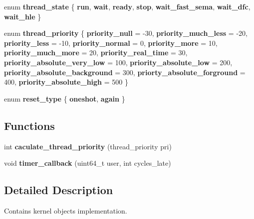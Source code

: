 \begin{DoxyCompactItemize}
enum {\bfseries thread\+\_\+state} \{ \newline
{\bfseries run}, 
{\bfseries wait}, 
{\bfseries ready}, 
{\bfseries stop}, 
\newline
{\bfseries wait\+\_\+fast\+\_\+sema}, 
{\bfseries wait\+\_\+dfc}, 
{\bfseries wait\+\_\+hle}
 \}
\item 
\mbox{\label{namespaceeka2l1_1_1kernel_a2eace89f7110e838a1260c2d9cb41ac4}} 
enum {\bfseries thread\+\_\+priority} \{ \newline
{\bfseries priority\+\_\+null} = -\/30, 
{\bfseries priority\+\_\+much\+\_\+less} = -\/20, 
{\bfseries priority\+\_\+less} = -\/10, 
{\bfseries priority\+\_\+normal} = 0, 
\newline
{\bfseries priority\+\_\+more} = 10, 
{\bfseries priority\+\_\+much\+\_\+more} = 20, 
{\bfseries priority\+\_\+real\+\_\+time} = 30, 
{\bfseries priority\+\_\+absolute\+\_\+very\+\_\+low} = 100, 
\newline
{\bfseries priority\+\_\+absolute\+\_\+low} = 200, 
{\bfseries priority\+\_\+absolute\+\_\+background} = 300, 
{\bfseries priorty\+\_\+absolute\+\_\+forground} = 400, 
{\bfseries priority\+\_\+absolute\+\_\+high} = 500
 \}
\item 
\mbox{\label{namespaceeka2l1_1_1kernel_a67e2a6c2c23b5f98212166d57d0dca1c}} 
enum {\bfseries reset\+\_\+type} \{ {\bfseries oneshot}, 
{\bfseries again}
 \}
\end{DoxyCompactItemize}
\subsection*{Functions}
\begin{DoxyCompactItemize}
\item 
\mbox{\label{namespaceeka2l1_1_1kernel_a476693d75fe4803f493e0d030b4bcb84}} 
int {\bfseries caculate\+\_\+thread\+\_\+priority} (thread\+\_\+priority pri)
\item 
\mbox{\label{namespaceeka2l1_1_1kernel_aead77f60bcf0c0e47c356347701e2d46}} 
void {\bfseries timer\+\_\+callback} (uint64\+\_\+t user, int cycles\+\_\+late)
\end{DoxyCompactItemize}


\subsection{Detailed Description}
Contains kernel objects implementation. 
